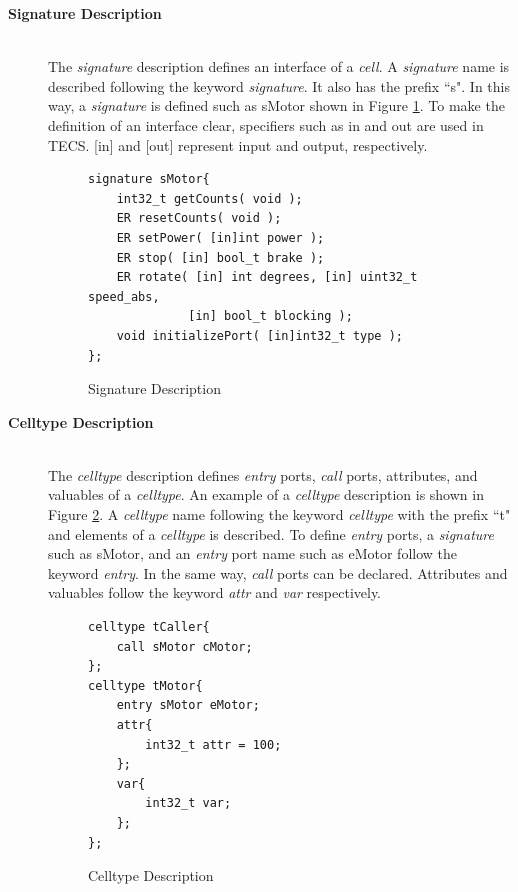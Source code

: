 \documentclass[conference,compsoc]{IEEEtran}
\begin{document}
\begin{description}
    \item[{\bf Signature Description}]\mbox{}\\
        The {\it signature} description defines an interface of a {\it cell}.
        A {\it signature} name is described following the keyword {\it signature}.
        It also has the prefix ``s".
        In this way, a {\it signature} is defined such as sMotor shown in Figure \ref{signature}.
        To make the definition of an interface clear, specifiers such as in and out are used in TECS.
        [in] and [out] represent input and output, respectively.\\
\begin{figure}[t]
\centering
\begin{lstlisting}
signature sMotor{
    int32_t getCounts( void );
    ER resetCounts( void );
    ER setPower( [in]int power );
    ER stop( [in] bool_t brake );
    ER rotate( [in] int degrees, [in] uint32_t speed_abs,
              [in] bool_t blocking );
    void initializePort( [in]int32_t type );
};
\end{lstlisting}
\caption{Signature Description}
\label{signature}
\end{figure}

    \item[{\bf Celltype Description}]\mbox{}\\
        The {\it celltype} description defines {\it entry} ports, {\it call} ports, attributes, and valuables of a {\it celltype}.
        An example of a {\it celltype} description is shown in Figure \ref{celltype}.
        A {\it celltype} name following the keyword {\it celltype} with the prefix ``t" and elements of a {\it celltype} is described.
        To define {\it entry} ports, a {\it signature} such as sMotor, and an {\it entry} port name such as eMotor follow the keyword {\it entry}.
        In the same way, {\it call} ports can be declared.
        Attributes and valuables follow the keyword {\it attr} and {\it var} respectively.\\
\begin{figure}[t]
\centering
\begin{lstlisting}
celltype tCaller{
    call sMotor cMotor;
};
celltype tMotor{
    entry sMotor eMotor;
    attr{
        int32_t attr = 100;
    };
    var{
        int32_t var;
    };
};
\end{lstlisting}
\caption{Celltype Description}
\label{celltype}
\end{figure}


\end{description}
\end{document}
